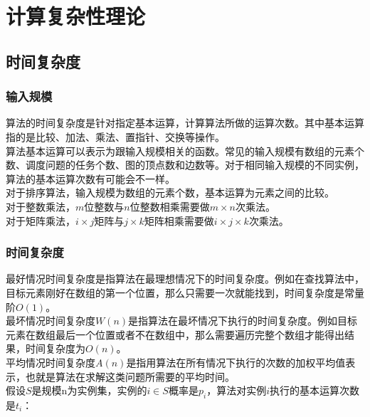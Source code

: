 \chapter{计算复杂性理论}

\section{时间复杂度}

\subsection{输入规模}

算法的时间复杂度是针对指定基本运算，计算算法所做的运算次数。其中基本运算指的是比较、加法、乘法、置指针、交换等操作。 \\

算法基本运算可以表示为跟输入规模相关的函数。常见的输入规模有数组的元素个数、调度问题的任务个数、图的顶点数和边数等。对于相同输入规模的不同实例，算法的基本运算次数有可能会不一样。 \\

对于排序算法，输入规模为数组的元素个数，基本运算为元素之间的比较。 \\

对于整数乘法，$ m $位整数与$ n $位整数相乘需要做$ m \times n $次乘法。 \\

对于矩阵乘法，$ i \times j $矩阵与$ j \times k $矩阵相乘需要做$ i \times j \times k $次乘法。

\subsection{时间复杂度}

最好情况时间复杂度是指算法在最理想情况下的时间复杂度。例如在查找算法中，目标元素刚好在数组的第一个位置，那么只需要一次就能找到，时间复杂度是常量阶$ O(1) $。 \\

最坏情况时间复杂度$ W(n) $是指算法在最坏情况下执行的时间复杂度。例如目标元素在数组最后一个位置或者不在数组中，那么需要遍历完整个数组才能得出结果，时间复杂度为$ O(n) $。 \\

平均情况时间复杂度$ A(n) $是指用算法在所有情况下执行的次数的加权平均值表示，也就是算法在求解这类问题所需要的平均时间。 \\

假设$ S $是规模n为实例集，实例的$ i \in S $概率是$ p_i $，算法对实例$ i $执行的基本运算次数是$ t_i $：


